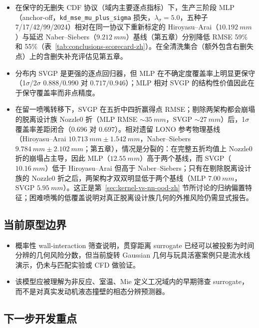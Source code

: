 \begin{itemize}
  \item 在保守的无删失 CDF 协议（域内主要逐点指标）下，生产三阶段 MLP（anchor-off，\texttt{kd\_mse\_mu\_plus\_sigma} 损失，\(\lambda_\sigma=5.0\)，五种子 7/17/42/99/2024）相对在同一协议下重新标定的 Hiroyasu--Arai（\(\SI{10.192}{mm}\)）与延迟 Naber--Siebers（\(\SI{9.212}{mm}\)）基线（第五章）分别降低 RMSE 59\% 和 55\%（表~\ref{tab:conclusions-scorecard-zh}）。在全清洗集合（额外包含右删失点）上的含删失补充评估见第五章。
  \item 分布内 SVGP 是更强的逐点回归器，但 MLP 在不确定度覆盖率上明显更保守（1$\sigma$/2$\sigma$ \(0.888/0.990\) 对 \(0.717/0.946\)）；MLP 相对 SVGP 的结构性价值因此在于保守覆盖率而非点精度。
  \item 在留一喷嘴转移下，SVGP 在五折中四折赢得点 RMSE；剔除两架构都会崩塌的脱离设计族 Nozzle0 折（MLP RMSE \(\sim\SI{35}{mm}\)，SVGP \(\sim\SI{27}{mm}\)）后，1$\sigma$ 覆盖率差距闭合（\(0.696\) 对 \(0.697\)）。相对遗留 LONO 参考物理基线（Hiroyasu--Arai \(\SI{10.713}{mm}\pm\SI{1.542}{mm}\)，Naber--Siebers \(\SI{9.784}{mm}\pm\SI{2.102}{mm}\)；第五章），情况是分裂的：在完整五折均值上 Nozzle0 折的崩塌占主导，因此 MLP（\(\SI{12.55}{mm}\)）高于两个基线，而 SVGP（\(\SI{10.16}{mm}\)）低于 Hiroyasu--Arai 但高于 Naber--Siebers；只有在剔除脱离设计族的 Nozzle0 折之后，两架构才双双明显低于两个基线（MLP \(\SI{7.00}{mm}\)，SVGP \(\SI{5.95}{mm}\)）。这正是第~\ref{sec:kernel-vs-nn-ood-zh} 节所讨论的归纳偏置特征；困难喷嘴的低覆盖说明对真正脱离设计族几何的外推风险仍需显式报告。
\end{itemize}

\subsection{当前原型边界}

\begin{itemize}
  \item 概率性 wall-interaction 筛查说明，贯穿距离 surrogate 已经可以被投影为时间分辨的几何风险分数，但当前旋转 Gaussian 几何与玩具活塞案例只是流水线演示，仍未与匹配实验或 CFD 做验证。
  \item 该模型应被理解为非反应、室温、Mie 定义工况域内的早期筛查 surrogate，而不是对真实发动机液态撞壁的相态分辨预测器。
\end{itemize}

\subsection{下一步开发重点}


